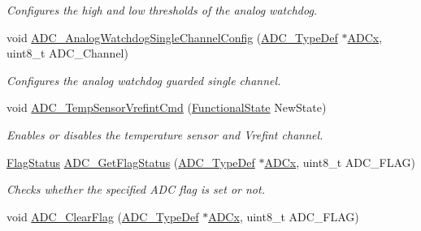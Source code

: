 \begin{DoxyCompactItemize}
\begin{DoxyCompactList}\small\item\em Configures the high and low thresholds of the analog watchdog. \end{DoxyCompactList}\item 
void \mbox{\hyperlink{group___a_d_c___exported___functions_ga03cef3d12292ffa2b8520524d5b0226c}{A\+D\+C\+\_\+\+Analog\+Watchdog\+Single\+Channel\+Config}} (\mbox{\hyperlink{struct_a_d_c___type_def}{A\+D\+C\+\_\+\+Type\+Def}} $\ast$\mbox{\hyperlink{group___s_t_m32_f1_x_x___n_u_c_l_e_o___l_o_w___l_e_v_e_l___exported___constants_gab44c1065d38c298955fc028346984340}{A\+D\+Cx}}, uint8\+\_\+t A\+D\+C\+\_\+\+Channel)
\begin{DoxyCompactList}\small\item\em Configures the analog watchdog guarded single channel. \end{DoxyCompactList}\item 
void \mbox{\hyperlink{group___a_d_c___exported___functions_ga848682e2d7d3de9f8cf03ffa4c11f0b5}{A\+D\+C\+\_\+\+Temp\+Sensor\+Vrefint\+Cmd}} (\mbox{\hyperlink{group___exported__types_gac9a7e9a35d2513ec15c3b537aaa4fba1}{Functional\+State}} New\+State)
\begin{DoxyCompactList}\small\item\em Enables or disables the temperature sensor and Vrefint channel. \end{DoxyCompactList}\item 
\mbox{\hyperlink{group___exported__types_ga89136caac2e14c55151f527ac02daaff}{Flag\+Status}} \mbox{\hyperlink{group___a_d_c___exported___functions_gaa12546e51ec905c90a3aada432bd4633}{A\+D\+C\+\_\+\+Get\+Flag\+Status}} (\mbox{\hyperlink{struct_a_d_c___type_def}{A\+D\+C\+\_\+\+Type\+Def}} $\ast$\mbox{\hyperlink{group___s_t_m32_f1_x_x___n_u_c_l_e_o___l_o_w___l_e_v_e_l___exported___constants_gab44c1065d38c298955fc028346984340}{A\+D\+Cx}}, uint8\+\_\+t A\+D\+C\+\_\+\+F\+L\+AG)
\begin{DoxyCompactList}\small\item\em Checks whether the specified A\+DC flag is set or not. \end{DoxyCompactList}\item 
void \mbox{\hyperlink{group___a_d_c___exported___functions_gaf34f36798f811b4a41321ea2d12118d4}{A\+D\+C\+\_\+\+Clear\+Flag}} (\mbox{\hyperlink{struct_a_d_c___type_def}{A\+D\+C\+\_\+\+Type\+Def}} $\ast$\mbox{\hyperlink{group___s_t_m32_f1_x_x___n_u_c_l_e_o___l_o_w___l_e_v_e_l___exported___constants_gab44c1065d38c298955fc028346984340}{A\+D\+Cx}}, uint8\+\_\+t A\+D\+C\+\_\+\+F\+L\+AG)

\end{DoxyCompactItemize}
